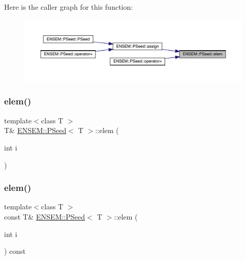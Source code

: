 Here is the caller graph for this function\+:
\nopagebreak
\begin{figure}[H]
\begin{center}
\leavevmode
\includegraphics[width=350pt]{dc/d14/classENSEM_1_1PSeed_aeed16139a22df65e16fd064b7808c49a_icgraph}
\end{center}
\end{figure}
\mbox{\label{classENSEM_1_1PSeed_aeed16139a22df65e16fd064b7808c49a}} 
\subsubsection{\texorpdfstring{elem()}{elem()}\hspace{0.1cm}{\footnotesize\ttfamily [3/6]}}
{\footnotesize\ttfamily template$<$class T $>$ \\
T\& \mbox{\hyperlink{classENSEM_1_1PSeed}{E\+N\+S\+E\+M\+::\+P\+Seed}}$<$ T $>$\+::elem (\begin{DoxyParamCaption}\item[{int}]{i }\end{DoxyParamCaption})\hspace{0.3cm}{\ttfamily [inline]}}

\mbox{\label{classENSEM_1_1PSeed_aa9151226aec3137be3417bbf36f770aa}} 
\subsubsection{\texorpdfstring{elem()}{elem()}\hspace{0.1cm}{\footnotesize\ttfamily [4/6]}}
{\footnotesize\ttfamily template$<$class T $>$ \\
const T\& \mbox{\hyperlink{classENSEM_1_1PSeed}{E\+N\+S\+E\+M\+::\+P\+Seed}}$<$ T $>$\+::elem (\begin{DoxyParamCaption}\item[{int}]{i }\end{DoxyParamCaption}) const\hspace{0.3cm}{\ttfamily [inline]}}

